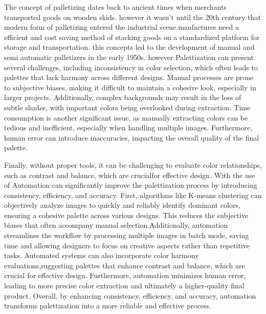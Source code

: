 The concept of palletizing dates back to ancient times when merchants transported goods on wooden skids. however it wasn't until the 20th century that modern form of palletizing entered the industrial scene.manfactures need a efficient and cost saving method of stacking goods on a standardized platform for storage and transportation. this concepts led to the development of manual and semi automatic palletizers in the early 1950s. however Palettization can present several challenges, including inconsistency in color selection, which often leads to palettes that lack harmony across different designs. Manual processes are prone to subjective biases, making it difficult to maintain a cohesive look, especially in larger projects. Additionally, complex backgrounds may result in the loss of subtle shades, with important colors being overlooked during extraction. Time consumption is another significant issue, as manually extracting colors can be tedious and inefficient, especially when handling multiple images. Furthermore, human error can introduce inaccuracies, impacting the overall quality of the final palette.


Finally, without proper tools, it can be challenging to evaluate color relationships, such as contrast and balance, which are crucialfor effective design. With the use of Automation can significantly improve the palettization process by introducing consistency, efficiency, and accuracy. First, algorithms like K-means clustering can objectively analyze images to quickly and reliably identify dominant colors, ensuring a cohesive palette across various designs. This reduces the subjective biases that often accompany manual selection.Additionally, automation streamlines the workflow by processing multiple images in batch mode, saving time and allowing designers to focus on creative aspects rather than repetitive tasks. Automated systems can also incorporate color harmony evaluations,suggesting palettes that enhance contrast and balance, which are crucial for effective design. Furthermore, automation minimizes human error, leading to more precise color extraction and ultimately a higher-quality final product. Overall, by enhancing consistency, efficiency, and accuracy, automation transforms palettization into a more reliable and effective process.